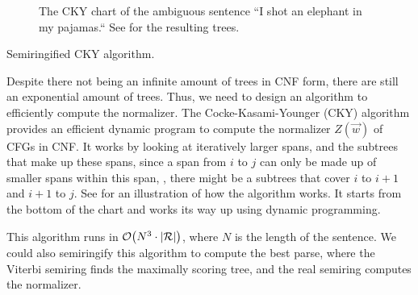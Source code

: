 \begin{figure}[h!]
    \centering
    \caption{The CKY chart of the ambiguous sentence ``I shot an elephant in my
    pajamas.`` See  for the resulting trees.}
    \label{fig:cky-chart}
\end{figure}
\vfill
\begin{algorithm}[h!]
  \caption{Semiringified CKY algorithm.}
  \label{alg:cky}

  \begin{algorithmic}[1]
       
        \EndFor
      \EndFor


            \EndFor
          \EndFor
        \EndFor
      \EndFor

      \State {}
    \EndFunction
  \end{algorithmic}
\end{algorithm}

Despite there not being an infinite amount of trees in CNF form, there are
still an exponential amount of trees. Thus, we need to design an algorithm to
efficiently compute the normalizer. The Cocke-Kasami-Younger (CKY)
\citep{cocke1969programming,kasami1966efficient,younger1967recognition}
algorithm provides an efficient dynamic program to compute the normalizer
$Z(\vec{w})$ of CFGs in CNF. It works by looking at iteratively larger spans,
and the subtrees that make up these spans, since a span from $i$ to $j$ can
only be made up of smaller spans within this span, \eg, there might be a
subtrees that cover $i$ to $i+1$ and $i+1$ to $j$. See
 for an illustration of how the algorithm works. It starts
from the bottom of the chart and works its way up using dynamic programming.

This algorithm runs in $\bigo{N^3\cdot |\mathcal{R}|}$, where $N$ is the length
of the sentence. We could also semiringify this algorithm to compute the best
parse, where the Viterbi semiring finds the maximally scoring tree, and the
real semiring computes the normalizer.
